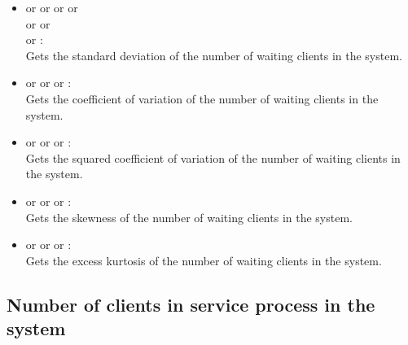 \begin{itemize}
\item
{} or  or  or  or\\
 or  or\\
 or :\\
Gets the standard deviation of the number of waiting clients in the system.

\item
{} or  or  or :\\
Gets the coefficient of variation of the number of waiting clients in the system.

\item
{} or  or  or :\\
Gets the squared coefficient of variation of the number of waiting clients in the system.

\item
{} or  or  or :\\
Gets the skewness of the number of waiting clients in the system.

\item
{} or  or  or :\\
Gets the excess kurtosis of the number of waiting clients in the system.

\end{itemize}



\subsection{Number of clients in service process in the system}

